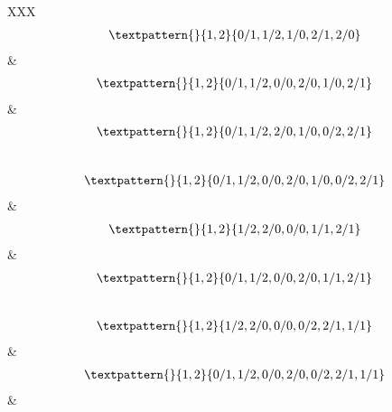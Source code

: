 \begin{center}
\begin{longtabu}[l]{XXX}
\begin{equation}
	\begin{gathered}
		\textpattern{}{1,2}{0/1,1/2,1/0,2/1,2/0}
	\end{gathered}
	\label{cls:74}
\end{equation}
    &
\begin{equation}
	\begin{gathered}
		\textpattern{}{1,2}{0/1,1/2,0/0,2/0,1/0,2/1}
	\end{gathered}
	\label{cls:75}
\end{equation}
    &
\begin{equation}
	\begin{gathered}
		\textpattern{}{1,2}{0/1,1/2,2/0,1/0,0/2,2/1}
	\end{gathered}
	\label{cls:76}
\end{equation}
\\
\begin{equation}
	\begin{gathered}
		\textpattern{}{1,2}{0/1,1/2,0/0,2/0,1/0,0/2,2/1}
	\end{gathered}
	\label{cls:77}
\end{equation}
    &
\begin{equation}
	\begin{gathered}
		\textpattern{}{1,2}{1/2,2/0,0/0,1/1,2/1}
	\end{gathered}
	\label{cls:78}
\end{equation}
    &
\begin{equation}
	\begin{gathered}
		\textpattern{}{1,2}{0/1,1/2,0/0,2/0,1/1,2/1}
	\end{gathered}
	\label{cls:79}
\end{equation}
\\
\begin{equation}
	\begin{gathered}
		\textpattern{}{1,2}{1/2,2/0,0/0,0/2,2/1,1/1}
	\end{gathered}
	\label{cls:80}
\end{equation}
    &
\begin{equation}
	\begin{gathered}
		\textpattern{}{1,2}{0/1,1/2,0/0,2/0,0/2,2/1,1/1}
	\end{gathered}
	\label{cls:81}
\end{equation}
    &
\begin{equation}
	\begin{gathered}

\end{gathered}
\end{equation}
\end{longtabu}
\end{center}
